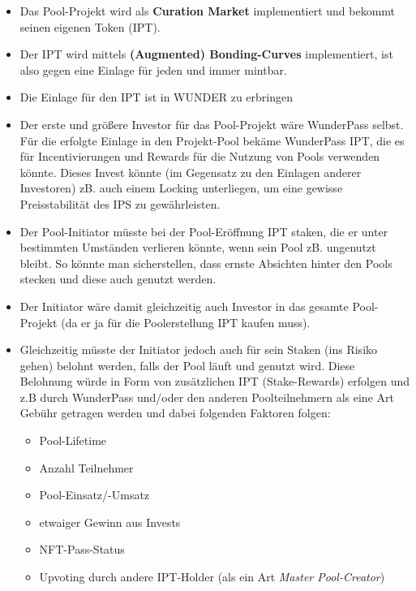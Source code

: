 
\begin{itemize}
	\item Das Pool-Projekt wird als \textbf{Curation Market} implementiert und bekommt seinen eigenen Token (IPT).
	\item Der IPT wird mittels \textbf{(Augmented) Bonding-Curves} implementiert, ist also gegen eine Einlage für jeden und immer mintbar.
	\item Die Einlage für den IPT ist in WUNDER zu erbringen 
	\item Der erste und größere Investor für das Pool-Projekt wäre WunderPass selbst. Für die erfolgte Einlage in den Projekt-Pool bekäme WunderPass IPT, die es für Incentivierungen und Rewards für die Nutzung von Pools verwenden könnte. Dieses Invest könnte (im Gegensatz zu den Einlagen anderer Investoren) zB. auch einem Locking unterliegen, um eine gewisse Preisstabilität des IPS zu gewährleisten.
	\item Der Pool-Initiator müsste bei der Pool-Eröffnung IPT staken, die er unter bestimmten Umständen verlieren könnte, wenn sein Pool zB. ungenutzt bleibt. So könnte man sicherstellen, dass ernste Absichten hinter den Pools stecken und diese auch genutzt werden. 
	\item Der Initiator wäre damit gleichzeitig auch Investor in das gesamte Pool-Projekt (da er ja für die Poolerstellung IPT kaufen muss).
	\item Gleichzeitig müsste der Initiator jedoch auch für sein Staken (ins Risiko gehen) belohnt werden, falls der Pool läuft und genutzt wird. Diese Belohnung würde in Form von zusätzlichen IPT (Stake-Rewards) erfolgen und z.B durch WunderPass und/oder den anderen Poolteilnehmern als eine Art Gebühr getragen werden und dabei folgenden Faktoren folgen:
	\begin{itemize}
		\item Pool-Lifetime
		\item Anzahl Teilnehmer
		\item Pool-Einsatz/-Umsatz
		\item etwaiger Gewinn aus Invests
		\item NFT-Pass-Status
		\item Upvoting durch andere IPT-Holder (als ein Art \textit{Master Pool-Creator})
	\end{itemize}

\end{itemize}
